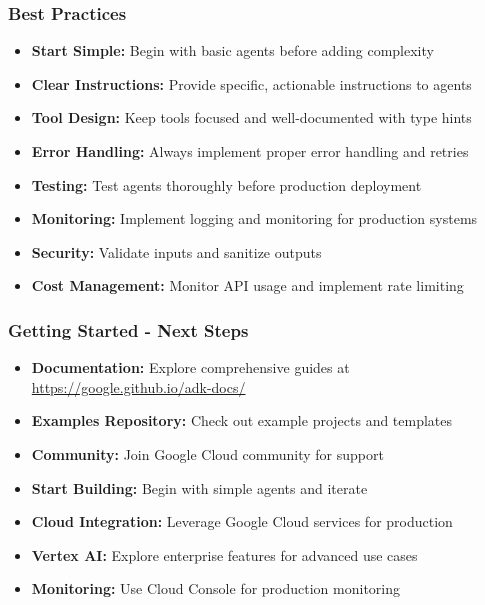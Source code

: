 \begin{frame}[fragile]\frametitle{Best Practices}
      \begin{itemize}
	\item \textbf{Start Simple:} Begin with basic agents before adding complexity
	\item \textbf{Clear Instructions:} Provide specific, actionable instructions to agents
	\item \textbf{Tool Design:} Keep tools focused and well-documented with type hints
	\item \textbf{Error Handling:} Always implement proper error handling and retries
	\item \textbf{Testing:} Test agents thoroughly before production deployment
	\item \textbf{Monitoring:} Implement logging and monitoring for production systems
	\item \textbf{Security:} Validate inputs and sanitize outputs
	\item \textbf{Cost Management:} Monitor API usage and implement rate limiting
	  \end{itemize}
\end{frame}

\begin{frame}[fragile]\frametitle{Getting Started - Next Steps}
      \begin{itemize}
	\item \textbf{Documentation:} Explore comprehensive guides at \url{https://google.github.io/adk-docs/}
	\item \textbf{Examples Repository:} Check out example projects and templates
	\item \textbf{Community:} Join Google Cloud community for support
	\item \textbf{Start Building:} Begin with simple agents and iterate
	\item \textbf{Cloud Integration:} Leverage Google Cloud services for production
	\item \textbf{Vertex AI:} Explore enterprise features for advanced use cases
	\item \textbf{Monitoring:} Use Cloud Console for production monitoring
	  \end{itemize}
\end{frame}

